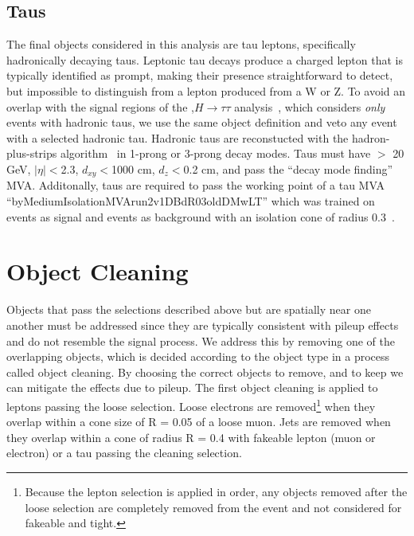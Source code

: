 \subsection{Taus}
The final objects considered in this analysis are tau leptons, specifically hadronically decaying taus. Leptonic tau decays produce a charged lepton that is typically identified as prompt,
making their presence straightforward to detect, but impossible to distinguish from a lepton produced from a W or Z. To avoid an overlap with the signal regions of the \tth,$H\rightarrow\tau\tau$
analysis~\cite{CMS-PAS-HIG-17-003}, which considers \emph{only} events with hadronic taus, we use the same object definition and veto any event with a selected hadronic tau. Hadronic taus are
reconstucted with the hadron-plus-strips algorithm~\cite{hps} in 1-prong or 3-prong decay modes. Taus must have \pt $>$ 20 GeV, $|\eta|<$2.3, $d_{xy}<$1000 cm, $d_{z}<$0.2 cm, and pass the
``decay mode finding'' MVA. Additonally, taus are required to pass the working point of a tau MVA ``byMediumIsolationMVArun2v1DBdR03oldDMwLT'' which was trained on \tth events as signal and
\ttbar events as background with an isolation cone of radius 0.3~\cite{CMS-AN-15-310}. 

\section{Object Cleaning}
Objects that pass the selections described above but are spatially near one another must be addressed since they are typically consistent with pileup effects and do not resemble the signal process.
We address this by removing one of the overlapping objects, which is decided according to the object type in a process called object cleaning. By choosing the correct objects to remove, and to keep
we can mitigate the effects due to pileup. The first object cleaning is applied to leptons passing the loose selection. Loose electrons are removed\footnote{Because the lepton selection is applied in
order, any objects removed after the loose selection are completely removed from the event and not considered for fakeable and tight.} when they overlap within a cone size of R = 0.05 of a loose muon. 
Jets are removed when they overlap within a cone of radius R = 0.4 with fakeable lepton (muon or electron) or a tau passing the cleaning selection.
